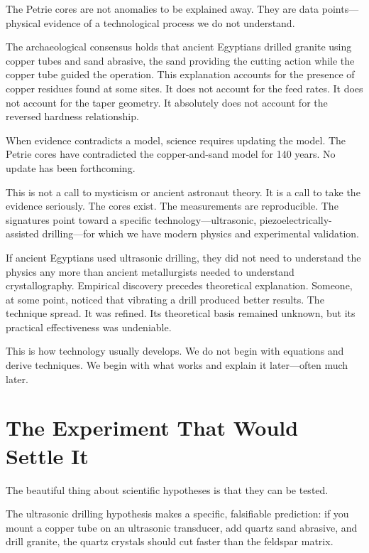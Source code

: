 \documentclass[11pt]{article}
\begin{document}
The Petrie cores are not anomalies to be explained away. They are data points---physical evidence of a technological process we do not understand.

The archaeological consensus holds that ancient Egyptians drilled granite using copper tubes and sand abrasive, the sand providing the cutting action while the copper tube guided the operation. This explanation accounts for the presence of copper residues found at some sites. It does not account for the feed rates. It does not account for the taper geometry. It absolutely does not account for the reversed hardness relationship.

When evidence contradicts a model, science requires updating the model. The Petrie cores have contradicted the copper-and-sand model for 140 years. No update has been forthcoming.

This is not a call to mysticism or ancient astronaut theory. It is a call to take the evidence seriously. The cores exist. The measurements are reproducible. The signatures point toward a specific technology---ultrasonic, piezoelectrically-assisted drilling---for which we have modern physics and experimental validation.

If ancient Egyptians used ultrasonic drilling, they did not need to understand the physics any more than ancient metallurgists needed to understand crystallography. Empirical discovery precedes theoretical explanation. Someone, at some point, noticed that vibrating a drill produced better results. The technique spread. It was refined. Its theoretical basis remained unknown, but its practical effectiveness was undeniable.

This is how technology usually develops. We do not begin with equations and derive techniques. We begin with what works and explain it later---often much later.

\section{The Experiment That Would Settle It}

The beautiful thing about scientific hypotheses is that they can be tested.

The ultrasonic drilling hypothesis makes a specific, falsifiable prediction: if you mount a copper tube on an ultrasonic transducer, add quartz sand abrasive, and drill granite, the quartz crystals should cut faster than the feldspar matrix.
\end{document}
